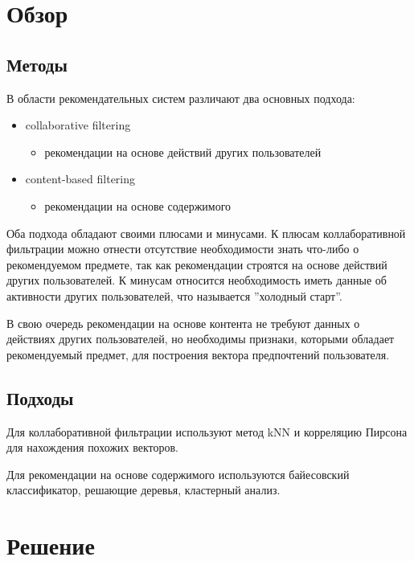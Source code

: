 \documentclass[14pt]{matmex-diploma-custom}
\begin{document}
\section{Обзор}

\subsection{Методы}

В области рекомендательных систем различают два основных подхода:

\begin{itemize}
	\item collaborative filtering
	      \begin{itemize}
		      \item рекомендации на основе действий других пользователей
	      \end{itemize}
	\item content-based filtering
	      \begin{itemize}
		      \item рекомендации на основе содержимого
	      \end{itemize}
\end{itemize}

Оба подхода обладают своими плюсами и минусами. К плюсам коллаборативной фильтрации можно отнести отсутствие необходимости знать что-либо о рекомендуемом предмете, так как рекомендации строятся на основе действий других пользователей. К минусам относится необходимость иметь данные об активности других пользователей, что называется ''холодный старт''.

В свою очередь рекомендации на основе контента не требуют данных о действиях других пользователей, но необходимы признаки, которыми обладает рекомендуемый предмет, для построения вектора предпочтений пользователя.


\subsection{Подходы}

Для коллаборативной фильтрации используют метод kNN \cite{wiki:knn} и корреляцию Пирсона для нахождения похожих векторов.

Для рекомендации на основе содержимого используются байесовский классификатор, решающие деревья, кластерный анализ.

\section{Решение}
\end{document}
